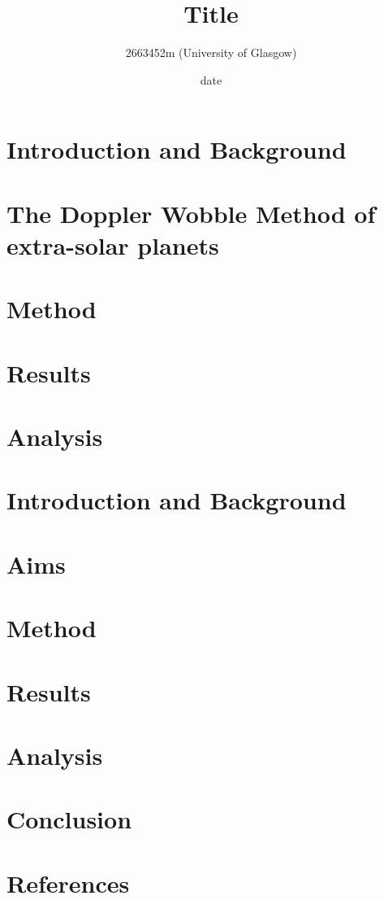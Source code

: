 \documentclass[]{article}
\title{\textbf{Title}}
\author{2663452m (University of Glasgow)}
\date{date}
\begin{document}
\maketitle

\begin{abstract}
\end{abstract}
\newpage





\section*{Introduction and Background}

\section*{The Doppler Wobble Method of extra-solar planets}




\section*{Method}




\section*{Results}



\section*{Analysis}




\newpage
\section*{Introduction and Background}

\section*{Aims}



\section*{Method}

\section*{Results}

\section*{Analysis}


\section*{Conclusion}

\section*{References}
\end{document}
